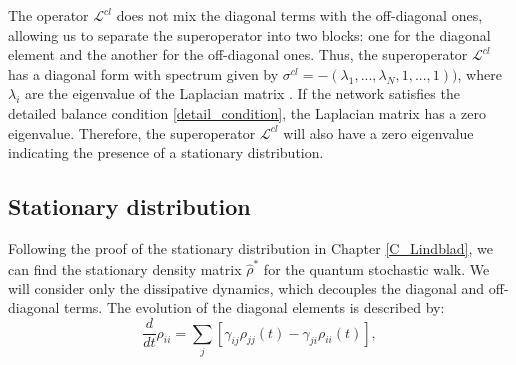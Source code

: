 The operator $\mathcal{L}^{cl}$ does not mix the diagonal terms with the off-diagonal ones, allowing us to separate the superoperator into two blocks: one for the diagonal element and the another for the off-diagonal ones.
Thus, the superoperator $\mathcal{L}^{cl}$ has a diagonal form with spectrum given by $\sigma^{cl} = -(\lambda_1,...,\lambda_N,1,...,1))$, where $\lambda_i$ are the eigenvalue of the Laplacian matrix \cite{Bruderer_Plenio}.
If the network satisfies the detailed balance condition \eqref{detail_condition}, the Laplacian matrix has a zero eigenvalue. Therefore, the superoperator $\mathcal{L}^{cl}$ will also have a zero eigenvalue indicating the presence of a stationary distribution.

\begin{comment}
    \begin{equation}
    \begin{split}
    \mathcal{L}^{qm}\ket{k}\bra{l} =& -i\hat L\ket{k}\bra{l} + i \ket{k}\bra{l}\hat L\\
    &=\frac{i}{2}\sum_{ij} - L_{ij}\ket{i}\braket{j}{k}\bra{l} + \ket{k}\braket{l}{i}\bra{j}\\
    &=\frac{1}{2}\sum_i -L_{ik} \ket{i}\bra{l} + \sum_i L_{li}\ket{k}\bra{i}\\
\end{split}
\end{equation}

Instead the diagonal terms
\begin{equation}
\begin{split}
\mathcal{L}^{qm}\ket{l}\bra{l} =& -i\hat L\ket{l}\bra{l} + i \ket{l}\bra{l}\hat L\\
&=\frac{i}{2}\sum_{ij} - L_{ij}\ket{i}\braket{j}{l}\bra{l} + \ket{l}\braket{l}{i}\bra{j}\\
&=\frac{1}{2}\sum_i -L_{il} \ket{i}\bra{l} + \sum_i L_{li}\ket{l}\bra{i} = 0\\
\end{split}
\end{equation}
\end{comment}

\subsection{Stationary distribution}

Following the proof of the stationary distribution in Chapter \ref{C_Lindblad}, we can find the stationary density matrix $\hat\rho^*$ for the quantum stochastic walk.
We will consider only the dissipative dynamics, which decouples the diagonal and off-diagonal terms. The evolution of the diagonal elements is described by:
\begin{equation}
    \frac{d}{dt}\rho_{ii} = \sum_j\left[\gamma_{ij}\rho_{jj}(t) - \gamma_{ji}\rho_{ii}(t)\right],
\end{equation}


